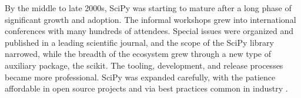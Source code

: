 \documentclass[fleqn,10pt]{wlscirep}
\begin{document}
%
%
%
%
%
%
%
%
%
%
%
%
%
%
%
%
%
%
%
%
%
%
%
%
%
%


By the middle to late 2000s, SciPy was starting to mature after a long phase of significant
growth and adoption.
The informal workshops grew into international conferences with many
hundreds of attendees. Special issues were organized and published in a
leading scientific journal\cite{dubois2007guest}, and the scope of the SciPy library
narrowed, while the breadth of the ecosystem grew
through a new type of auxiliary package, the scikit\cite{scikits-general}. 
The tooling, development, and release processes became more professional.
SciPy was expanded carefully, with the patience affordable in open source 
projects and via best practices common in industry \cite{millman2014developing}.
\end{document}
